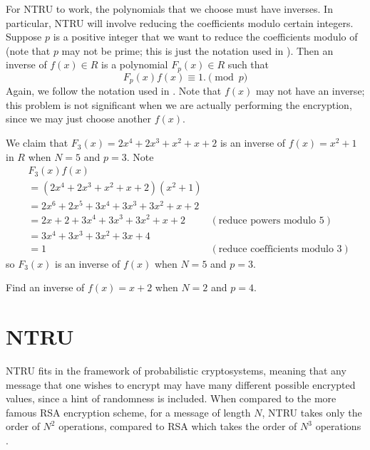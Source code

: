 For NTRU to work, the polynomials that we choose must have inverses. In particular, NTRU will involve reducing the coefficients modulo certain integers. Suppose $p$ is a positive integer that we want to reduce the coefficients modulo of (note that $p$ may not be prime; this is just the notation used in \cite[\S~1.1]{hoffstein_pipher_silverman_1998}). Then an inverse of $f(x) \in R$ is a polynomial $F_p(x) \in R$ such that
\[
    F_p(x)f(x) \equiv 1. \pmod p
\]
Again, we follow the notation used in \cite{hoffstein_pipher_silverman_1998}. Note that $f(x)$ may not have an inverse; this problem is not significant when we are actually performing the encryption, since we may just choose another $f(x)$.

\begin{example}
    We claim that $F_3(x) = 2x^4 + 2x^3 + x^2 + x + 2$ is an inverse of $f(x) = x^2 + 1$ in $R$ when $N = 5$ and $p = 3$. Note
    \begin{align*}
        &F_3(x)f(x)\\
        &= (2x^4 + 2x^3 + x^2 + x + 2)(x^2+1)\\
        &= 2x^6 + 2x^5 + 3x^4 + 3x^3 + 3x^2 + x + 2\\
        &= 2x + 2 + 3x^4 + 3x^3 + 3x^2 + x + 2 & (\text{reduce powers modulo 5})\\
        &= 3x^4 + 3x^3 + 3x^2 + 3x + 4\\
        &= 1 & (\text{reduce coefficients modulo 3})
    \end{align*}
    so $F_3(x)$ is an inverse of $f(x)$ when $N = 5$ and $p = 3$.
\end{example}

\begin{exercise}
    Find an inverse of $f(x) = x + 2$ when $N = 2$ and $p = 4$.
\end{exercise}

\section{NTRU}
NTRU fits in the framework of probabilistic cryptosystems, meaning that any message that one wishes to encrypt may have many different possible encrypted values, since a hint of randomness is included. When compared to the more famous RSA encryption scheme, for a message of length $N$, NTRU takes only the order of $N^2$ operations, compared to RSA which takes the order of $N^3$ operations \cite[p.~268]{hoffstein_pipher_silverman_1998}.


